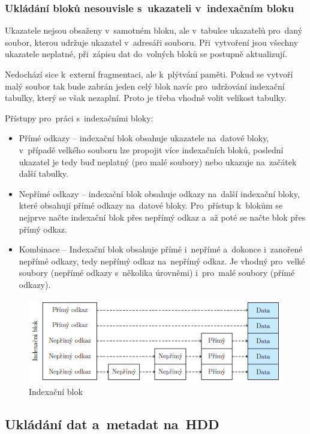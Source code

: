 \subsubsection{Ukládání bloků nesouvisle s~ukazateli v~indexačním bloku}

Ukazatele nejsou obsaženy v~samotném bloku, ale v~tabulce ukazatelů pro~daný soubor, kterou udržuje ukazatel v~adresáři souboru. Při~vytvoření jsou všechny ukazatele neplatné, při~zápisu dat do~volných bloků se postupně aktualizují.

Nedochází sice k~externí fragmentaci, ale k~plýtvání paměti. Pokud se vytvoří malý soubor tak bude zabrán jeden celý blok navíc pro~udržování indexační tabulky, který se však nezaplní. Proto je třeba vhodně volit velikost tabulky.

Přístupy pro~práci s~indexačními bloky:
\begin{itemize}[noitemsep]
	\item Přímé odkazy -- indexační blok obsahuje ukazatele na~datové bloky, v~případě velkého souboru lze propojit více indexačních bloků, poslední ukazatel je tedy buď neplatný (pro malé soubory) nebo ukazuje na~začátek další tabulky.
	\item Nepřímé odkazy -- indexační blok obsahuje odkazy na~další indexační bloky, které obsahují přímé odkazy na~datové bloky. Pro~přístup k~blokům se nejprve načte indexační blok přes nepřímý odkaz a~až poté se načte blok přes přímý odkaz.
	\item Kombinace -- Indexační blok obsahuje přímé i~nepřímé a~dokonce i~zanořené nepřímé odkazy, tedy nepřímý odkaz na~nepřímý odkaz. Je vhodný pro~velké soubory (nepřímé odkazy s~několika úrovněmi) i~pro~malé soubory (přímé odkazy).
\end{itemize}

\begin{figure}[ht]
	\centering
	\includegraphics[scale=1.2]{images/mem_block_index.png}
	\caption{Indexační blok}
	\label{mem_block_index}
\end{figure}

\subsection{Ukládání dat a~metadat na~HDD}

